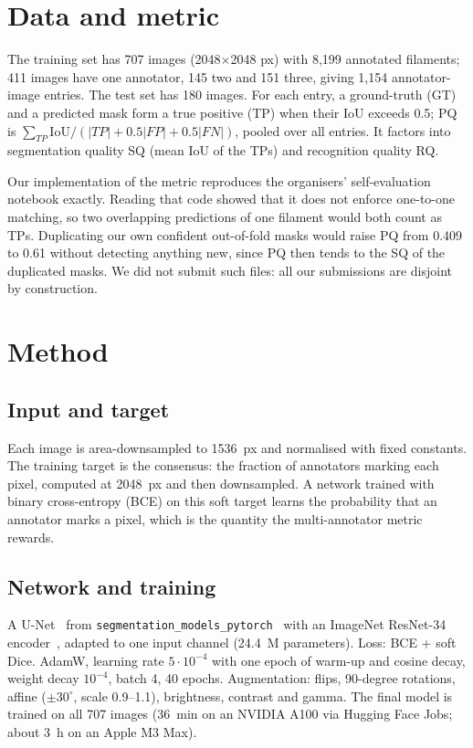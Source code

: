\documentclass[conference]{IEEEtran}
\begin{document}
\section{Data and metric}
The training set has 707 images (2048$\times$2048 px) with 8{,}199 annotated filaments; 411 images have
one annotator, 145 two and 151 three, giving 1{,}154 annotator-image entries. The test set has 180 images.
For each entry, a ground-truth (GT) and a predicted mask form a true positive (TP) when their IoU exceeds
0.5; PQ is $\sum_{TP}\mathrm{IoU} / (|TP| + 0.5|FP| + 0.5|FN|)$, pooled over all entries. It factors into
segmentation quality SQ (mean IoU of the TPs) and recognition quality RQ.

Our implementation of the metric reproduces the organisers' self-evaluation notebook exactly. Reading
that code showed that it does not enforce one-to-one matching, so two overlapping predictions of one
filament would both count as TPs. Duplicating our own confident out-of-fold masks would raise PQ from
0.409 to 0.61 without detecting anything new, since PQ then tends to the SQ of the duplicated masks.
We did not submit such files: all our submissions are disjoint by construction.

\section{Method}
\subsection{Input and target}
Each image is area-downsampled to 1536~px and normalised with fixed constants. The training target is
the consensus: the fraction of annotators marking each pixel, computed at 2048~px and then downsampled.
A network trained with binary cross-entropy (BCE) on this soft target learns the probability that an
annotator marks a pixel, which is the quantity the multi-annotator metric rewards.

\subsection{Network and training}
A U-Net~\cite{unet} from \texttt{segmentation\_models\_pytorch}~\cite{smp} with an ImageNet ResNet-34
encoder~\cite{resnet}, adapted to one input channel (24.4~M parameters). Loss: BCE + soft Dice. AdamW,
learning rate $5\cdot10^{-4}$ with one epoch of warm-up and cosine decay, weight decay $10^{-4}$, batch 4,
40 epochs. Augmentation: flips, 90-degree rotations, affine ($\pm30^\circ$, scale 0.9--1.1), brightness,
contrast and gamma. The final model is trained on all 707 images (36~min on an NVIDIA A100 via
Hugging Face Jobs; about 3~h on an Apple M3 Max).
\end{document}
